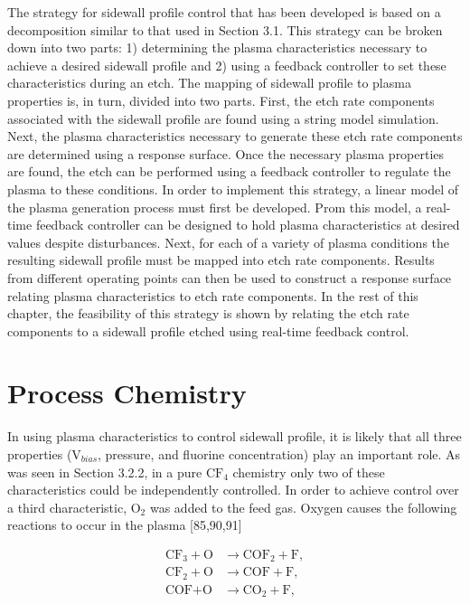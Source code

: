 The strategy for sidewall profile control that has been developed is based on a decomposition similar to that used in Section 3.1. This strategy can be broken down into two
parts: 1) determining the plasma characteristics necessary to achieve a desired sidewall
profile and 2) using a feedback controller to set these characteristics during an etch. The
mapping of sidewall profile to plasma properties is, in turn, divided into two parts. First, the etch rate components associated with the sidewall profile are found using a string model
simulation. Next, the plasma characteristics necessary to generate these etch rate components are determined using a response surface. Once the necessary plasma properties are
found, the etch can be performed using a feedback controller to regulate the plasma to these
conditions. In order to implement this strategy, a linear model of the plasma generation
process must first be developed. Prom this model, a real-time feedback controller can be
designed to hold plasma characteristics at desired values despite disturbances. Next, for
each of a variety of plasma conditions the resulting sidewall profile must be mapped into
etch rate components. Results from different operating points can then be used to construct
a response surface relating plasma characteristics to etch rate components. In the rest of
this chapter, the feasibility of this strategy is shown by relating the etch rate components
to a sidewall profile etched using real-time feedback control.

\section{Process Chemistry}
\tab In using plasma characteristics to control sidewall profile, it is likely that all three
properties ($\text{V}_{bias}$, pressure, and fluorine concentration) play an important role. As was seen in Section 3.2.2, in a pure $\text{CF}_{4}$ chemistry only two of these characteristics could be independently controlled. In order to achieve control over a third characteristic, $\text{O}_{2}$ was added to the feed gas. Oxygen causes the following reactions to occur in the plasma [85,90,91]

\begin{align}
	\text{CF}_{3} + \text{O} &\rightarrow \text{COF}_{2} + \text{F}, \\
	\text{CF}_{2} + \text{O} &\rightarrow \text{COF} + \text{F}, \\
	\text{COF} + \text{O} &\rightarrow \text{CO}_{2} + \text{F}, 
\end{align}

